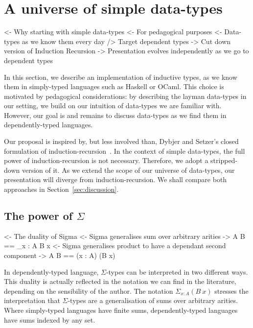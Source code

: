 \section{A universe of simple data-types}

\begin{wstructure}
<- Why starting with simple data-types
    <- For pedagogical purposes
        <- Data-types as we know them every day
        /> Target dependent types
    -> Cut down version of Induction Recursion
        -> Presentation evolves independently as we go to dependent types
\end{wstructure}

In this section, we describe an implementation of inductive types, as
we know them in simply-typed languages such as Haskell or OCaml. This
choice is motivated by pedagogical considerations: by describing the
layman data-types in our setting, we build on our intuition of
data-types we are familiar with. However, our goal is and remains to
discuss data-types as we find them in dependently-typed languages.

Our proposal is inspired by, but less involved than, Dybjer and
Setzer's closed formulation of
induction-recursion~\cite{dybjer:general-ir, dybjer:axiom-ir,
  dybjer:ir-initial-algebra, dybjer:iir}. In the context of simple
data-types, the full power of induction-recursion is not
necessary. Therefore, we adopt a stripped-down version of it. As we
extend the scope of our universe of data-types, our presentation will
diverge from induction-recursion. We shall compare both approaches in
Section~\ref{sec:discussion}.

\subsection{The power of $\Sigma$}

\begin{wstructure}
<- The duality of Sigma
    <- Sigma generalises sum over arbitrary arities
        -> \Sigma A B == \Sigma_{x : A} B x
    <- Sigma generalises product to have a dependant second component
        -> \Sigma A B == (x : A) \times (B x)
\end{wstructure}

In dependently-typed language, $\Sigma$-types can be interpreted in
two different ways. This duality is actually reflected in the notation
we can find in the literature, depending on the sensibility of the author.
The notation $\Sigma_{x : A} (B\: x)$ stresses the interpretation that
$\Sigma$-types are a generalisation of sums over arbitrary arities.  Where
simply-typed languages have finite sums, dependently-typed languages have
sums indexed by any set.

